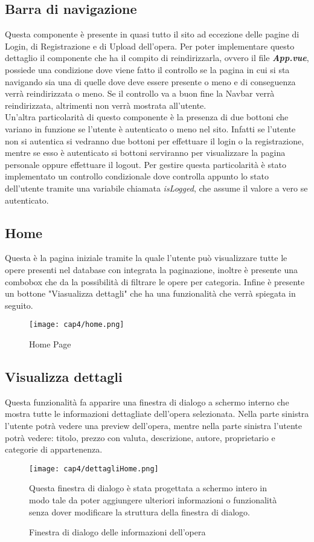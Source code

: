 \subsection{Barra di navigazione}
Questa componente è presente in quasi tutto il sito ad eccezione delle pagine di Login, di Registrazione e di Upload dell'opera. Per poter implementare questo dettaglio il componente che ha il compito di reindirizzarla, ovvero il file \textbf{\textit{App.vue}}, possiede una condizione dove viene fatto il controllo se la pagina in cui si sta navigando sia una di quelle dove deve essere presente o meno e di conseguenza verrà reindirizzata o meno. Se il controllo va a buon fine la Navbar verrà reindirizzata, altrimenti non verrà mostrata all'utente.\\
Un'altra particolarità di questo componente è la presenza di due bottoni che variano in funzione se l'utente è autenticato o meno nel sito. Infatti se l'utente non si autentica si vedranno due bottoni per effettuare il login o la registrazione, mentre se esso è autenticato si bottoni serviranno per visualizzare la pagina personale oppure effettuare il logout. Per gestire questa particolarità è stato implementato un controllo condizionale dove controlla appunto lo stato dell'utente tramite una variabile chiamata \textit{isLogged}, che assume il valore a vero se autenticato.
\subsection{Home}
Questa è la pagina iniziale tramite la quale l'utente può visualizzare tutte le opere presenti nel database con integrata la paginazione, inoltre è presente una combobox che da la possibilità di filtrare le opere per categoria. Infine è presente un bottone "Viasualizza dettagli" che ha una funzionalità che verrà spiegata in seguito.
\begin{figure}[H]
	\begin{center}
		\texttt{[image: cap4/home.png]}
		\caption{Home Page}
	\end{center}
\end{figure}
\subsection{Visualizza dettagli}
Questa funzionalità fa apparire una finestra di dialogo a schermo interno che mostra tutte le informazioni dettagliate dell'opera selezionata. Nella parte sinistra l'utente potrà vedere una preview dell'opera, mentre nella parte sinistra l'utente potrà vedere: titolo, prezzo con valuta, descrizione, autore, proprietario e categorie di appartenenza.
\begin{figure}[H]
	\begin{center}
		\texttt{[image: cap4/dettagliHome.png]}
		\caption{Finestra di dialogo delle informazioni dell'opera}
	\end{center}
Questa finestra di dialogo è stata progettata a schermo intero in modo tale da poter aggiungere ulteriori informazioni o funzionalità senza dover modificare la struttura della finestra di dialogo.
\end{figure}
